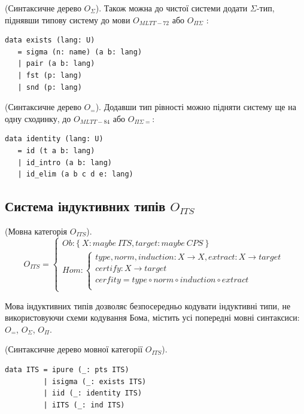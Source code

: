 \begin{definition} (Синтаксичне дерево $O_\Sigma$).
Також можна до чистої системи додати $\Sigma$-тип,
піднявши типову систему до мови $O_{MLTT-72}$ або $O_{\Pi\Sigma}$ :
\begin{lstlisting}[mathescape=true]
data exists (lang: U)
   = sigma (n: name) (a b: lang)
   | pair (a b: lang)
   | fst (p: lang)
   | snd (p: lang)
\end{lstlisting}
\end{definition}

\begin{definition} (Синтаксичне дерево $O_=$).
Додавши тип рівності можно підняти систему ще на одну сходинку,
до $O_{MLTT-84}$ або $O_{\Pi\Sigma=}$:
\begin{lstlisting}[mathescape=true]
data identity (lang: U)
   = id (t a b: lang)
   | id_intro (a b: lang)
   | id_elim (a b c d e: lang)
\end{lstlisting}
\end{definition}

\subsection{Система індуктивних типів $O_{ITS}$}

\begin{definition} (Мовна категорія $O_{ITS}$).
\begin{equation}
O_{ITS} =
\begin{cases}
Ob: \{\ X: maybe\ ITS, target: maybe\ CPS\ \} \\
Hom: \begin{cases}
type,norm,induction: X \rightarrow X, extract: X \rightarrow target \\
certify : X \rightarrow target \\
cerfity = type \circ norm \circ induction \circ extract \\
\end{cases}
\end{cases}
\end{equation}
\end{definition}

Мова індуктивних типів дозволяє безпосередньо кодувати індуктивні типи,
не використовуючи схеми кодування Бома, містить усі попередні мовні синтаксиси:
$O_=$, $O_\Sigma$, $O_\Pi$.

\begin{definition} (Синтаксичне дерево мовної категорії $O_{ITS}$).
\begin{lstlisting}
data ITS = ipure (_: pts ITS)
         | isigma (_: exists ITS)
         | iid (_: identity ITS)
         | iITS (_: ind ITS)
\end{lstlisting}
\end{definition}

